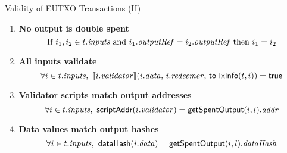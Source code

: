 \begin{frame}{Validity of EUTXO Transactions (II)}

\begin{enumerate}
\conti

\item
  \label{rule:no-double-spending}
  \textbf{No output is double spent}
  \begin{displaymath}
    \textrm{If } i_1, i_2 \in t.\mathit{inputs} \textrm{ and }  i_1.\mathit{outputRef} = i_2.\mathit{outputRef}
    \textrm{ then } i_1 = i_2
  \end{displaymath}

\item
  \label{rule:all-inputs-validate}
  \textbf{All inputs validate}
  \begin{displaymath}
    \forall i \in t.\inputs,\ \llbracket
    i.\validator\rrbracket (i.\dataVal,\, i.\redeemerVal,\, \toPtx(t,i)) = \true
  \end{displaymath}

\item
  \label{rule:validator-scripts-hash}
  \textbf{Validator scripts match output addresses}
  \begin{displaymath}
    \forall i \in t.\mathit{inputs},\ \mathsf{scriptAddr}(i.\mathit{validator}) = \mathsf{getSpentOutput}(i, l).\mathit{addr}
  \end{displaymath}

\item
  \label{rule:data-values-hash}
  \textbf{Data values match output hashes}
  \begin{displaymath}
    \forall i \in t.\inputs,\ \hashData(i.\dataVal) = \getSpent(i, l).\dataHsh
  \end{displaymath}
\end{enumerate}

\end{frame}
